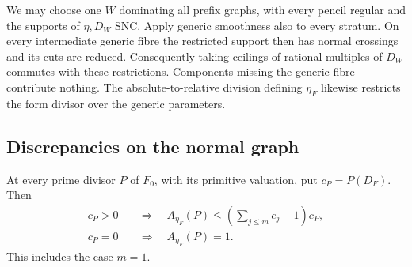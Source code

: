 We may choose one $W$ dominating all prefix graphs, with every pencil
regular and the supports of $\eta,D_W$ SNC.  Apply generic smoothness
also to every stratum.  On every intermediate generic fibre the
restricted support then has normal crossings and its cuts are reduced.
Consequently taking ceilings of rational multiples of $D_W$ commutes
with these restrictions.  Components missing the generic fibre
contribute nothing.  The absolute-to-relative division defining
$\eta_F$ likewise restricts the form divisor over the generic
parameters.

\subsection{Discrepancies on the normal graph}

\begin{lemma}\label{prod:graph-bound}
At every prime divisor $P$ of $F_0$, with its primitive valuation, put
$c_P=P(D_F)$.  Then
\begin{equation}\label{prod:graph-estimate}
 \begin{aligned}
 c_P>0&\quad\Longrightarrow\quad
 A_{\eta_F}(P)\leq
          \left(\sum_{j\leq m}e_j-1\right)c_P,\\
 c_P=0&\quad\Longrightarrow\quad A_{\eta_F}(P)=1.
 \end{aligned}
\end{equation}
This includes the case $m=1$.
\end{lemma}

